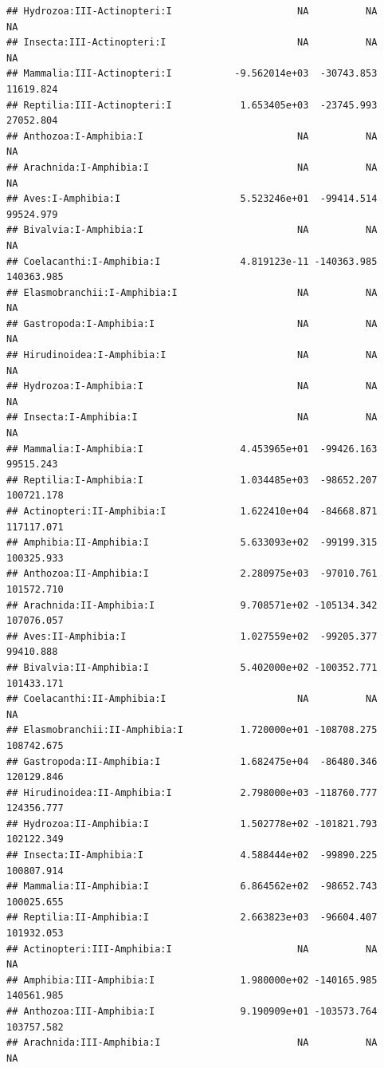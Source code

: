 \documentclass[
  12pt,
]{article}
\begin{document}
\begin{verbatim}
## Hydrozoa:III-Actinopteri:I                      NA          NA          NA
## Insecta:III-Actinopteri:I                       NA          NA          NA
## Mammalia:III-Actinopteri:I           -9.562014e+03  -30743.853   11619.824
## Reptilia:III-Actinopteri:I            1.653405e+03  -23745.993   27052.804
## Anthozoa:I-Amphibia:I                           NA          NA          NA
## Arachnida:I-Amphibia:I                          NA          NA          NA
## Aves:I-Amphibia:I                     5.523246e+01  -99414.514   99524.979
## Bivalvia:I-Amphibia:I                           NA          NA          NA
## Coelacanthi:I-Amphibia:I              4.819123e-11 -140363.985  140363.985
## Elasmobranchii:I-Amphibia:I                     NA          NA          NA
## Gastropoda:I-Amphibia:I                         NA          NA          NA
## Hirudinoidea:I-Amphibia:I                       NA          NA          NA
## Hydrozoa:I-Amphibia:I                           NA          NA          NA
## Insecta:I-Amphibia:I                            NA          NA          NA
## Mammalia:I-Amphibia:I                 4.453965e+01  -99426.163   99515.243
## Reptilia:I-Amphibia:I                 1.034485e+03  -98652.207  100721.178
## Actinopteri:II-Amphibia:I             1.622410e+04  -84668.871  117117.071
## Amphibia:II-Amphibia:I                5.633093e+02  -99199.315  100325.933
## Anthozoa:II-Amphibia:I                2.280975e+03  -97010.761  101572.710
## Arachnida:II-Amphibia:I               9.708571e+02 -105134.342  107076.057
## Aves:II-Amphibia:I                    1.027559e+02  -99205.377   99410.888
## Bivalvia:II-Amphibia:I                5.402000e+02 -100352.771  101433.171
## Coelacanthi:II-Amphibia:I                       NA          NA          NA
## Elasmobranchii:II-Amphibia:I          1.720000e+01 -108708.275  108742.675
## Gastropoda:II-Amphibia:I              1.682475e+04  -86480.346  120129.846
## Hirudinoidea:II-Amphibia:I            2.798000e+03 -118760.777  124356.777
## Hydrozoa:II-Amphibia:I                1.502778e+02 -101821.793  102122.349
## Insecta:II-Amphibia:I                 4.588444e+02  -99890.225  100807.914
## Mammalia:II-Amphibia:I                6.864562e+02  -98652.743  100025.655
## Reptilia:II-Amphibia:I                2.663823e+03  -96604.407  101932.053
## Actinopteri:III-Amphibia:I                      NA          NA          NA
## Amphibia:III-Amphibia:I               1.980000e+02 -140165.985  140561.985
## Anthozoa:III-Amphibia:I               9.190909e+01 -103573.764  103757.582
## Arachnida:III-Amphibia:I                        NA          NA          NA

\end{verbatim}
\end{document}
